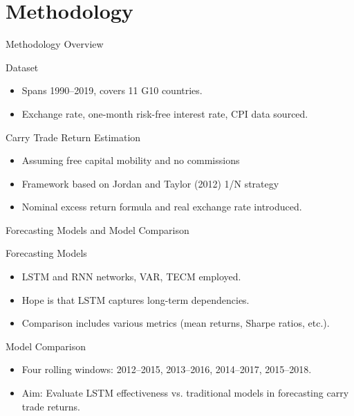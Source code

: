 \documentclass{beamer}
\begin{document}
\section{Methodology}

\begin{frame}{Methodology Overview}
    \begin{block}{Dataset}
        \begin{itemize}
            \item Spans 1990–2019, covers 11 G10 countries.
            \item Exchange rate, one-month risk-free interest rate, CPI data sourced.
        \end{itemize}
    \end{block}

    \begin{block}{Carry Trade Return Estimation}
        \begin{itemize}
            \item Assuming free capital mobility and no commissions
            \item Framework based on Jordan and Taylor (2012) 1/N strategy
            \item Nominal excess return formula and real exchange rate introduced.
        \end{itemize}
    \end{block}
\end{frame}

\begin{frame}{Forecasting Models and Model Comparison}
    \begin{block}{Forecasting Models}
        \begin{itemize}
            \item LSTM and RNN networks, VAR, TECM employed.
            \item Hope is that LSTM captures long-term dependencies.
            \item Comparison includes various metrics (mean returns, Sharpe ratios, etc.).
        \end{itemize}
    \end{block}

    \begin{block}{Model Comparison}
        \begin{itemize}
            \item Four rolling windows: 2012–2015, 2013–2016, 2014–2017, 2015–2018.
            \item Aim: Evaluate LSTM effectiveness vs. traditional models in forecasting carry trade returns.
        \end{itemize}
    \end{block}
\end{frame}
\end{document}
